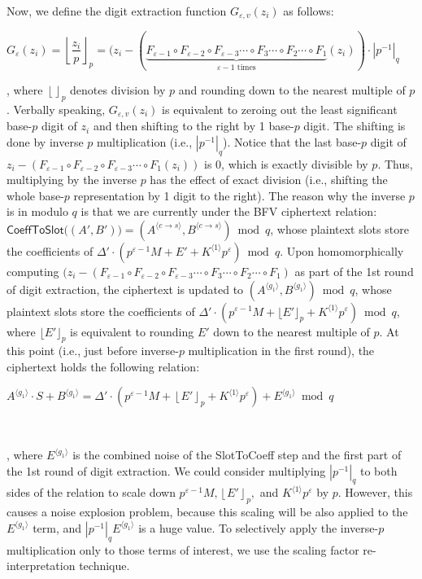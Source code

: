 $ $

Now, we define the digit extraction function $G_{\varepsilon, v}(z_i)$ as follows:

$G_{\varepsilon}(z_i) = \left\lfloor\dfrac{z_i}{p}\right\rfloor_p = (z_i - (\underbrace{F_{\varepsilon-1}  \circ F_{\varepsilon-2}  \circ F_{\varepsilon-3}  \cdots \circ F_{3} \cdots \circ F_{2}  \cdots \circ F_{1}}_{\varepsilon - 1 \text{ times}}(z_i)) \cdot |p^{-1}|_{q} $


, where $\left\lfloor\right\rfloor_p$ denotes division by $p$ and rounding down to the nearest multiple of $p$. Verbally speaking, $G_{\varepsilon, v}(z_i)$ is equivalent to zeroing out the least significant base-$p$ digit of $z_i$ and then shifting to the right by 1 base-$p$ digit. The shifting is done by inverse $p$ multiplication (i.e., $|p^{-1}|_{q}$). Notice that the last base-$p$ digit of $z_i - (F_{\varepsilon-1}  \circ F_{\varepsilon-2}  \circ F_{\varepsilon-3}  \cdots \circ F_{1}(z_i))$ is 0, which is exactly divisible by $p$. Thus, multiplying by the inverse $p$ has the effect of exact division (i.e., shifting the whole base-$p$ representation by 1 digit to the right). The reason why the inverse $p$ is in modulo $q$ is that we are currently under the BFV ciphertext relation: $\textsf{CoeffToSlot}\bm((A', B')\bm) = (A^{\langle c\rightarrow s \rangle}, B^{\langle c\rightarrow s \rangle}) \bmod q$, whose plaintext slots store the coefficients of $\Delta' \cdot (p^{\varepsilon - 1}M + E' + K^{\langle 1 \rangle}p^{\varepsilon}) \bmod q$. Upon homomorphically computing $(z_i - (F_{\varepsilon-1}  \circ F_{\varepsilon-2}  \circ F_{\varepsilon-3}  \cdots \circ F_{3} \cdots \circ F_{2}  \cdots \circ F_{1})$ as part of the 1st round of digit extraction, the ciphertext is updated to $(A^{\langle g_1 \rangle}, B^{\langle g_1 \rangle}) \bmod q$, whose plaintext slots store the coefficients of $\Delta' \cdot (p^{\varepsilon - 1}M + \lfloor E' \rfloor_p + K^{\langle 1 \rangle}p^{\varepsilon}) \bmod q$, where $\lfloor E' \rfloor_p$ is equivalent to rounding $E'$ down to the nearest multiple of $p$. At this point (i.e., just before inverse-$p$ multiplication in the first round), the ciphertext holds the following relation:

$A^{\langle g_1 \rangle}\cdot S  + B^{\langle g_1 \rangle} = \Delta' \cdot (p^{\varepsilon - 1}M + \left\lfloor{E'}\right\rfloor_p + K^{\langle 1 \rangle}p^{\varepsilon}) + E^{\langle g_1 \rangle} \bmod q$


$ $

, where $E^{\langle g_1 \rangle}$ is the combined noise of the \textsf{SlotToCoeff} step and the first part of the 1st round of digit extraction. We could consider multiplying $|p^{-1}|_q$ to both sides of the relation to scale down $p^{\varepsilon - 1}M, \left\lfloor{E'}\right\rfloor_p,$ and $K^{\langle 1 \rangle}p^{\varepsilon}$ by $p$. However, this causes a noise explosion problem, because this scaling will be also applied to the $E^{\langle g_1 \rangle}$ term, and $|p^{-1}|_qE^{\langle g_1 \rangle}$ is a huge value. To selectively apply the inverse-$p$ multiplication only to those terms of interest, we use the scaling factor re-interpretation technique. 

